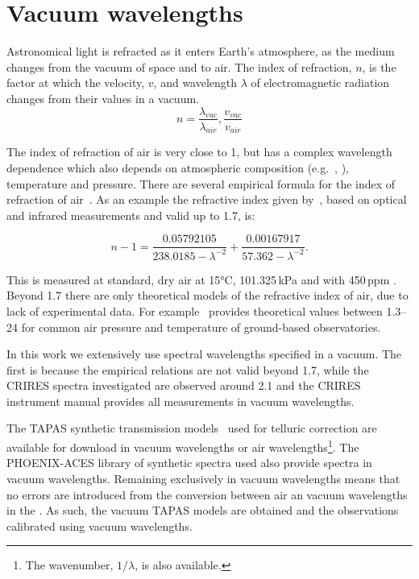 
\chapter{Vacuum wavelengths}
Astronomical light is refracted as it enters Earth's atmosphere, as the medium changes from the vacuum of space and to air.
The index of refraction, \(n\), is the factor at which the velocity, \(v\), and wavelength \(\lambda\) of electromagnetic radiation changes from their values in a vacuum.
\begin{equation}
n  = \frac{\lambda_{vac}}{\lambda_{air}}, \frac{v_{vac}}{v_{air}}
\end{equation}

The index of refraction of air is very close to 1, but has a complex wavelength dependence which also depends on atmospheric composition (e.g.\ , ), temperature and pressure.
There are several empirical formula for the index of refraction of air~\citep[e.g.][]{edlen_dispersion_1953, peck_dispersion_1972, ciddor_refractive_1996}.
As an example the refractive index given by~\citet{ciddor_refractive_1996}, based on optical and infrared measurements and valid up to 1.7\um{}, is:

\begin{equation}
    n -1 = \frac{0.05792105}{238.0185 - \lambda^{-2}} + \frac{0.00167917}{57.362 - \lambda^{-2}}.
\end{equation}

This is measured at standard, dry air at 15\si{\degreeCelsius}, 101.325\,\si{\kilo\pascal} and with 450\,ppm .
Beyond 1.7\um{} there are only theoretical models of the refractive index of air, due to lack of experimental data.
For example~\citet{mathar_refractive_2007} provides theoretical values between 1.3--24\um{} for common air pressure and temperature of ground-based observatories.

In this work we extensively use spectral wavelengths specified in a vacuum.
The first is because the empirical relations are not valid beyond 1.7\um{}, while the {CRIRES} spectra investigated are observed around 2.1\um{} and the {CRIRES} instrument manual provides all measurements in vacuum wavelengths.

The {TAPAS} synthetic transmission models~\citet{bertaux_tapas_2014} used for telluric correction are available for download in vacuum wavelengths or air wavelengths\footnote{The wavenumber, \(1/\lambda\), is also available.}.
The {PHOENIX-ACES} library of synthetic spectra used also provide spectra in vacuum wavelengths.
Remaining exclusively in vacuum wavelengths means that no errors are introduced from the conversion between air an vacuum wavelengths in the \nir{}.
As such, the vacuum {TAPAS} models are obtained and the observations calibrated using vacuum wavelengths.
